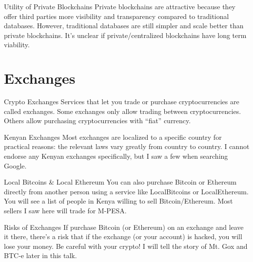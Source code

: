 \documentclass[14pt]{beamer}
\begin{document}
\begin{frame}{Utility of Private Blockchains}
  Private blockchains are attractive because they offer third parties more
  visibility and transparency compared to traditional databases.
  \newline
  \newline
  However, traditional databases are still simpler and scale better than private
  blockchains.
  \newline
  \newline
  It's unclear if private/centralized blockchains have long term viability.
\end{frame}

\section{Exchanges}

\begin{frame}{Crypto Exchanges}
  Services that let you trade or purchase cryptocurrencies are called exchanges.
  \newline
  \newline
  Some exchanges only allow trading between cryptocurrencies. Others allow
  purchasing cryptocurrencies with ``fiat'' currency.
\end{frame}

\begin{frame}{Kenyan Exchanges}
  Most exchanges are localized to a specific country for practical reasons: the
  relevant laws vary greatly from country to country.
  \newline
  \newline
  I cannot endorse any Kenyan exchanges specifically, but I saw a few when
  searching Google.
\end{frame}

\begin{frame}{Local Bitcoins \& Local Ethereum}
  You can also purchase Bitcoin or Ethereum directly from another person using a
  service like LocalBitcoins or LocalEthereum.
  \newline
  \newline
  You will see a list of people in Kenya willing to sell Bitcoin/Ethereum. Most
  sellers I saw here will trade for M-PESA.
\end{frame}

\begin{frame}{Risks of Exchanges}
  If purchase Bitcoin (or Ethereum) on an exchange and leave it there, there's a
  risk that if the exchange (or your account) is hacked, you will lose your
  money.
  \newline
  \newline
  Be careful with your crypto! I will tell the story of Mt. Gox and BTC-e
  later in this talk.
\end{frame}
\end{document}
